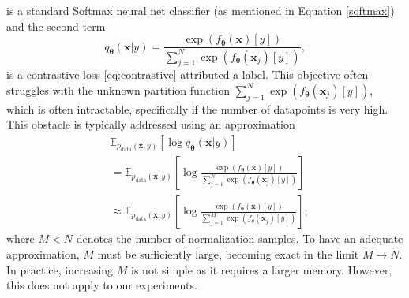 is a standard Softmax neural net classifier (as mentioned in Equation \eqref{softmax}) and the second term 
\begin{equation}
	q_{\boldsymbol{\theta}}\left(\boldsymbol{x}|y\right) = \frac{\exp\left({f_{\boldsymbol{\theta}}\left(\boldsymbol{x}\right)[y]}\right)}{\sum_{j=1}^N\exp\left({f_{\boldsymbol{\theta}}\left(\boldsymbol{x}_j\right)[y]}\right)},
\end{equation}
is a contrastive loss \eqref{eq:contrastive} attributed a label. This objective often struggles with the unknown partition function $\sum_{j=1}^N\exp\left({f_{\boldsymbol{\theta}}\left({\boldsymbol{x}_j}\right)[y]}\right)$, which is often intractable, specifically if the number of datapoints is very high. This obstacle is typically addressed using an approximation 
\begin{align}\label{approxcontrasstive}
	&\mathbb{E}_{p_{\mathrm{data}}(\boldsymbol{x},y)}\left[ \log q_{\boldsymbol{\theta}}\left(\boldsymbol{x}|y\right) \right] \\
	&=\mathbb{E}_{p_{\mathrm{data}}(\boldsymbol{x},y)}\left[\log \frac{\exp\left({f_{\boldsymbol{\theta}}\left(\boldsymbol{x}\right)[y]}\right)}{\sum_{j=1}^N\exp\left({f_{\boldsymbol{\theta}}\left(\boldsymbol{x}_j\right)[y]}\right)} \right]  \\
	&\approx\mathbb{E}_{p_{\mathrm{data}}(\boldsymbol{x},y)}\left[\log \frac{\exp\left({f_{\boldsymbol{\theta}}\left(\boldsymbol{x}\right)[y]}\right)}{\sum_{j=1}^M\exp\left({f_\theta\left(\boldsymbol{x}_j\right)[y]}\right)} \right],
\end{align}
where $M < N$ denotes the number of normalization samples. To have an adequate approximation, $M$ must be sufficiently large, becoming exact in the limit $M \to N$. In practice, increasing $M$ is not simple as it requires a larger memory. However, this does not apply to our experiments. 

